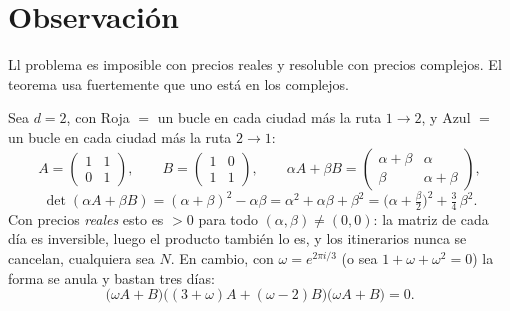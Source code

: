 \documentclass[11pt,a4paper]{amsproc}
\begin{document}
\section*{Observación}

Ll problema es imposible con precios reales y resoluble con 
precios complejos. El teorema usa fuertemente que
uno está en los complejos. 

Sea $d=2$, con Roja $=$ un bucle en cada ciudad más la ruta $1\to 2$, y Azul $=$ un bucle
en cada ciudad más la ruta $2\to 1$:
\[
  A=\begin{pmatrix}1&1\\0&1\end{pmatrix},\qquad
  B=\begin{pmatrix}1&0\\1&1\end{pmatrix},\qquad
  \alpha A+\beta B=\begin{pmatrix}\alpha+\beta&\alpha\\ \beta&\alpha+\beta\end{pmatrix},
\]
\[
  \det(\alpha A+\beta B)=(\alpha+\beta)^2-\alpha\beta=\alpha^2+\alpha\beta+\beta^2
  =\Big(\alpha+\tfrac{\beta}{2}\Big)^{\!2}+\tfrac34\,\beta^2 .
\]
Con precios \emph{reales} esto es $>0$ para todo $(\alpha,\beta)\neq(0,0)$: la matriz de cada
día es inversible, luego el producto también lo es, y los itinerarios nunca se cancelan,
cualquiera sea $N$. En cambio, con $\omega=e^{2\pi i/3}$ (o sea $1+\omega+\omega^2=0$) la
forma se anula y bastan tres días:
\[
  \bigl(\omega A+B\bigr)\bigl((3+\omega)A+(\omega-2)B\bigr)\bigl(\omega A+B\bigr)=0 .
\]
\end{document}
